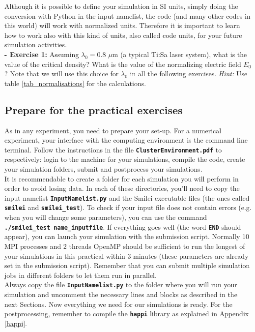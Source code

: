 \documentclass[a4paper,12pt]{extarticle}
\newcommand{\smilei}{{\sc Smilei}\xspace}
\newcommand{\commandline}[1]{\texttt{\textbf{#1}}}
\begin{document}
Although it is possible to define your simulation in SI units, simply doing the conversion with Python in the input namelist, the code (and many other codes in this world) will work with normalized units. Therefore it is important to learn how to work also with this kind of units, also called code units, for your future simulation activities. \\

\textbf{ - Exercise 1:} Assuming $\lambda_0=0.8$ $\mu$m (a typical Ti:Sa laser system), what is the value of the critical density? What is the value of the normalizing electric field $E_0$? Note that we will use this choice for $\lambda_0$ in all the following exercises. \textit{Hint:} Use table \ref{tab_normalisations} for the calculations.


\subsection{Prepare for the practical exercises}

As in any experiment, you need to prepare your set-up. For a numerical experiment, your interface with the computing environment is the command line terminal. Follow the instructions in the file \commandline{ClusterEnvironment.pdf} to respectively: login to the machine for your simulations, compile the code, create your simulation folders, submit and postprocess your simulations.\\

It is recommendable to create a folder for each simulation you will perform in order to avoid losing data. In each of these directories, you'll need to copy the input namelist \commandline{InputNamelist.py} and the \smilei executable files (the ones called \commandline{smilei} and \commandline{smilei\_test}). To check if your input file does not contain errors (e.g. when you will change some parameters), you can use the command \commandline{./smilei\_test name\_inputfile}. If everything goes well (the word \commandline{END} should appear), you can launch your simulation with the submission script. Normally 10 MPI processes and 2 threads OpenMP should be sufficient to run the longest of your simulations in this practical within 3 minutes (these parameters are already set in the submission script). Remember that you can submit multiple simulation jobs in different folders to let them run in parallel.\\

Always copy the file \commandline{InputNamelist.py} to the folder where you will run your simulation and uncomment the necessary lines and blocks as described in the next Sections. Now everything we need for our simulations is ready. For the postprocessing, remember to compile the \commandline{happi} library as explained in Appendix \ref{happi}.\\
\end{document}
